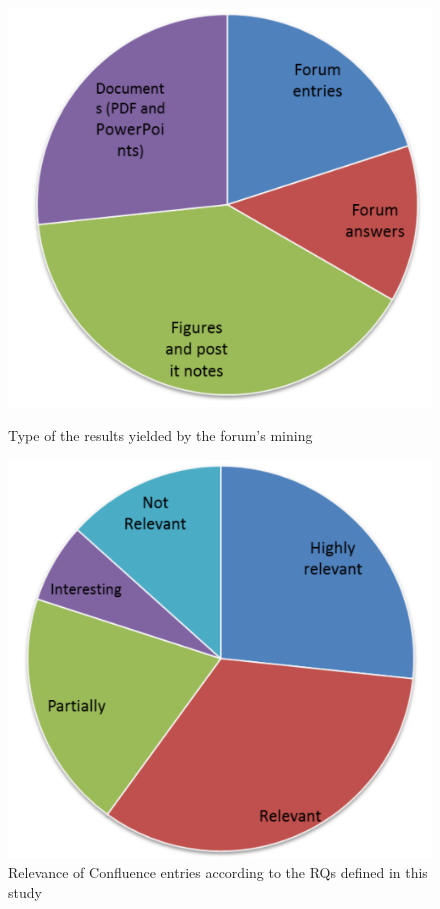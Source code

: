 

\begin{figure}[ht]
    \centering
    \begin{minipage}[t]{0.45\linewidth}
        \centering
        \includegraphics[width=\textwidth]{figure/results/confluence_doc_types}
        \caption{Type of the results yielded by the forum's mining}
        \label{fig:confluence_types}
    \end{minipage}
    \hspace{0.5cm}
    \begin{minipage}[t]{0.45\linewidth}
        \centering
        \includegraphics[width=\textwidth]{figure/results/confluence_doc_relevance}
        \caption{Relevance of Confluence entries according to the RQs defined in this study}
        \label{fig:confluence_relevance}
    \end{minipage}
\end{figure}


